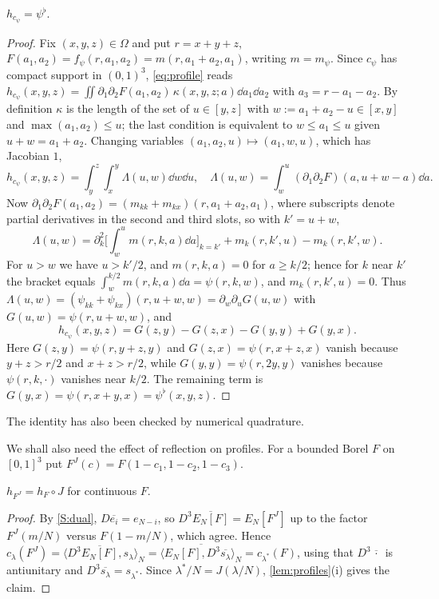 \documentclass[11pt,colorlinks]{charlie}
\newcommand{\Om}{\Omega}
\newcommand{\ip}[2]{\langle #1,#2\rangle}
\begin{document}
\begin{lemma}\label{lem:markedprofile}
$h_{c_\psi}=\psi^\flat$.
\end{lemma}
\begin{proof}
Fix $(x,y,z)\in\Om$ and put $r=x+y+z$, $F(a_1,a_2)=f_\psi(r,a_1,a_2)=m(r,a_1+a_2,a_1)$, writing $m=m_\psi$. Since $c_\psi$ has compact support in $(0,1)^3$, \eqref{eq:profile} reads $h_{c_\psi}(x,y,z)=\iint\partial_1\partial_2F(a_1,a_2)\,\kappa(x,y,z;a)\dd a_1\dd a_2$ with $a_3=r-a_1-a_2$. By definition $\kappa$ is the length of the set of $u\in[y,z]$ with $w:=a_1+a_2-u\in[x,y]$ and $\max(a_1,a_2)\le u$; the last condition is equivalent to $w\le a_1\le u$ given $u+w=a_1+a_2$. Changing variables $(a_1,a_2,u)\mapsto(a_1,w,u)$, which has Jacobian $1$,
\[
 h_{c_\psi}(x,y,z)=\int_y^z\!\!\int_x^y\Lambda(u,w)\dd w\dd u,\quad\Lambda(u,w)=\int_w^u(\partial_1\partial_2F)(a,u+w-a)\dd a .
\]
Now $\partial_1\partial_2F(a_1,a_2)=(m_{kk}+m_{kx})(r,a_1+a_2,a_1)$, where subscripts denote partial derivatives in the second and third slots, so with $k'=u+w$,
\[
 \Lambda(u,w)=\partial_k^2\Big[\int_w^um(r,k,a)\dd a\Big]_{k=k'}+m_k(r,k',u)-m_k(r,k',w).
\]
For $u>w$ we have $u>k'/2$, and $m(r,k,a)=0$ for $a\ge k/2$; hence for $k$ near $k'$ the bracket equals $\int_w^{k/2}m(r,k,a)\dd a=\psi(r,k,w)$, and $m_k(r,k',u)=0$. Thus $\Lambda(u,w)=(\psi_{kk}+\psi_{kx})(r,u+w,w)=\partial_w\partial_u G(u,w)$ with $G(u,w)=\psi(r,u+w,w)$, and
\[
 h_{c_\psi}(x,y,z)=G(z,y)-G(z,x)-G(y,y)+G(y,x).
\]
Here $G(z,y)=\psi(r,y+z,y)$ and $G(z,x)=\psi(r,x+z,x)$ vanish because $y+z>r/2$ and $x+z>r/2$, while $G(y,y)=\psi(r,2y,y)$ vanishes because $\psi(r,k,\cdot)$ vanishes near $k/2$. The remaining term is $G(y,x)=\psi(r,x+y,x)=\psi^\flat(x,y,z)$.
\end{proof}

\noindent The identity has also been checked by numerical quadrature.

We shall also need the effect of reflection on profiles. For a bounded Borel $F$ on $[0,1]^3$ put $F^J(c)=F(1-c_1,1-c_2,1-c_3)$.

\begin{lemma}\label{lem:reflectedprofile}
$h_{F^J}=h_F\circ J$ for continuous $F$.
\end{lemma}
\begin{proof}
By \ref{S:dual}, $D\overline{e_i}=e_{N-i}$, so $D^3\overline{E_N[F]}=E_N[F^J]$ up to the factor $F^J(m/N)$ versus $F(1-m/N)$, which agree. Hence $c_\lambda(F^J)=\ip{D^3\overline{E_N[F]}}{s_\lambda}_N=\overline{\ip{E_N[F]}{D^3\overline{s_\lambda}}_N}=c_{\lambda^*}(F)$, using that $D^3\overline{\,\cdot\,}$ is antiunitary and $D^3\overline{s_\lambda}=s_{\lambda^*}$. Since $\lambda^*/N=J(\lambda/N)$, \cref{lem:profiles}(i) gives the claim.
\end{proof}
\end{document}
